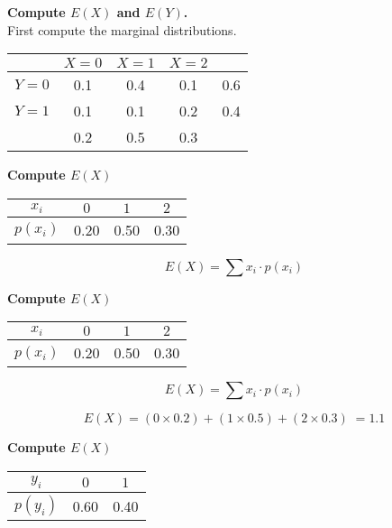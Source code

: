 \documentclass[]{report}
\begin{document}
	
	
	
	
	\textbf{Compute $E(X)$ and $E(Y)$.}\\
	First compute the marginal distributions.
	
	\begin{center}
		\begin{tabular}{|c|c|c|c||c|}
			\hline  & $X=0$ & $X=1$ & $X=2$  &\phantom{spaces}\\ 
			\hline $Y=0$ & 0.1  & 0.4 & 0.1 & 0.6\\ 
			\hline  $Y=1$ & 0.1 & 0.1 & 0.2 & 0.4\\ \hline
			\hline & 0.2& 0.5& 0.3& \\
			\hline 
		\end{tabular} 
	\end{center}
	
	\textbf{Compute $E(X)$}
	\begin{center}
		\begin{tabular}{|c|c|c|c|}
			\hline $x_i$ & $0$ & $1$ & $2$  \\ 
			\hline $p(x_i)$& 0.20 & 0.50 & 0.30 \\
			\hline 
		\end{tabular} 
	\end{center}
	\[ E(X) =  \sum  x_i \cdot p(x_i)   \]
	
	
	\textbf{Compute $E(X)$}
	\begin{center}
		\begin{tabular}{|c|c|c|c|}
			\hline $x_i$ & $0$ & $1$ & $2$  \\ 
			\hline $p(x_i)$& 0.20 & 0.50 & 0.30 \\
			\hline 
		\end{tabular} 
	\end{center}
	
	\[ E(X) =  \sum  x_i \cdot p(x_i)   \]
	
	\[E(X) =(0\times 0.2) + (1 \times 0.5) + (2 \times 0.3)\;  = 1.1\]
	
	\textbf{Compute $E(X)$}
	\begin{center}
		\begin{tabular}{|c|c|c|}
			\hline $y_i$ & $0$ & $1$  \\ 
			\hline $p(y_i)$& 0.60 & 0.40 \\
			\hline 
		\end{tabular} 
	\end{center}
	
\end{document}
